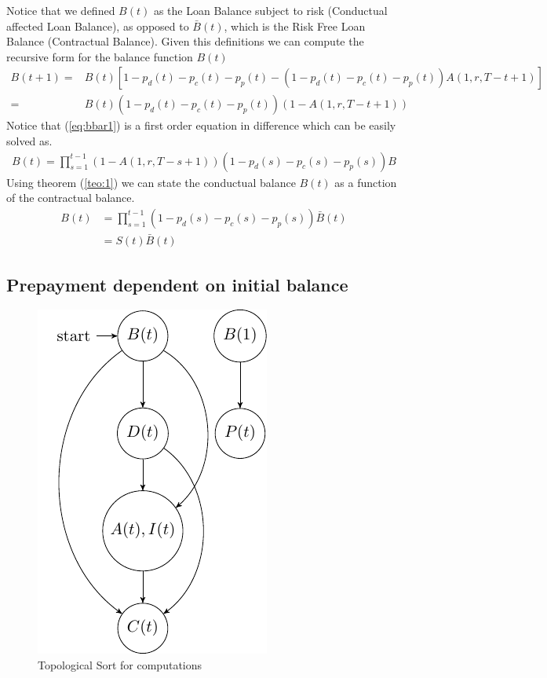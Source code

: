Notice that we defined $B(t)$ as the Loan Balance subject to risk (Conductual affected Loan Balance), as opposed to $\bar{B}(t)$, which is the Risk Free Loan Balance (Contractual Balance).  Given this definitions we can compute the recursive form for the balance function $B(t)$
\begin{align}
B(t+1) =& B(t)[1-p_d(t)-p_c(t)-p_p(t)-(1-p_d(t)-p_c(t)-p_p(t))A(1,r,T-t+1) ] \nonumber\\
     =&
    B(t)(1-p_d(t)-p_c(t)-p_p(t))(1-A(1,r,T-t+1)) \label{eq:bbar1}\
\end{align}
Notice that (\ref{eq:bbar1}) is a first order equation in difference which can be easily solved as.
\begin{align}
    B(t) =\prod^{t-1}_{s=1} (1-A(1,r,T-s+1))(1-p_d(s)-p_c(s)-p_p(s))B
\end{align}
Using theorem (\ref{teo:1}) we can state the conductual balance $B(t)$ as a function of the contractual balance.
\begin{align}
    B(t) &=\prod^{t-1}_{s=1} (1-p_d(s)-p_c(s)-p_p(s))\bar{B}(t) \nonumber\\
    &=S(t)\bar{B}(t)
\end{align}

\subsection{Prepayment dependent on initial balance}
\begin{figure}[H]
  \centering
      \includegraphics[width=.3\textwidth]{Graph1.pdf} 
 \caption{Topological Sort for computations}
 \label{fig:Test}
\end{figure}

